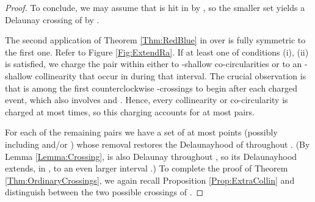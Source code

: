 \documentclass[letter,11pt]{article}
\begin{document}
\begin{proof}
To conclude, we may assume that  is hit in  by , so the smaller set  yields a Delaunay crossing of  by .


\smallskip
{} The second application of Theorem \ref{Thm:RedBlue} in  over  is fully symmetric to the first one. Refer to Figure \ref{Fig:ExtendRa}. If at least one of conditions (i), (ii) is satisfied, we charge the pair  within  either to  -shallow co-circularities or to an -shallow collinearity that occur in  during that interval. The crucial observation is that  is among the first  counterclockwise -crossings to begin after each charged event, which also involves  and . Hence, every collinearity or co-circularity is charged at most  times, so this charging accounts for at most  pairs.

For each of the remaining pairs  we have a set  of at most  points (possibly including  and/or ) whose removal restores the Delaunayhood of  throughout . (By Lemma \ref{Lemma:Crossing},  is also Delaunay throughout , so its Delaunayhood extends, in , to an even larger interval .)
To complete the proof of Theorem \ref{Thm:OrdinaryCrossings}, we again recall Proposition \ref{Prop:ExtraCollin} and distinguish between the two possible crossings of .


\end{proof}
\end{document}
